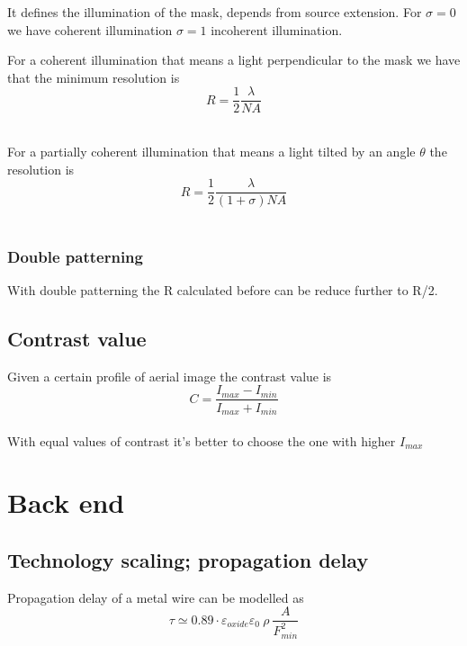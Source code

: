 It defines the illumination of the mask, depends from source extension. For $\sigma=0$ we have coherent illumination $\sigma=1$ incoherent illumination.\\

\vspace{3mm}

For a coherent illumination that means a light perpendicular to the mask we have that the minimum resolution is 
\begin{equation}
R=\frac{1}{2}\frac{\lambda}{NA}
\end{equation}
\\
\vspace{3mm}

For a partially coherent illumination that means a light tilted by an angle $\theta$ the resolution is
\begin{equation}
R=\frac{1}{2}\frac{\lambda}{(1+\sigma)NA}
\end{equation}
\\

\subsubsection{Double patterning}
With double patterning the R calculated before can be reduce further to R/2.\\



\subsection{Contrast value}
Given a certain profile of aerial image the contrast value is 
\begin{equation}
C=\frac{I_{max}-I_{min}}{I_{max}+I_{min}}
\end{equation}
\\
With equal values of contrast it's better to choose the one with higher $I_{max}$


\section{Back end}

\subsection{Technology scaling; propagation delay}
Propagation delay of a metal wire can be modelled as
\begin{equation}
\tau\simeq 0.89 \cdot \varepsilon_{oxide}\varepsilon_0 \ \rho \  \frac{A}{F_{min}^2} 
\end{equation}
\\

